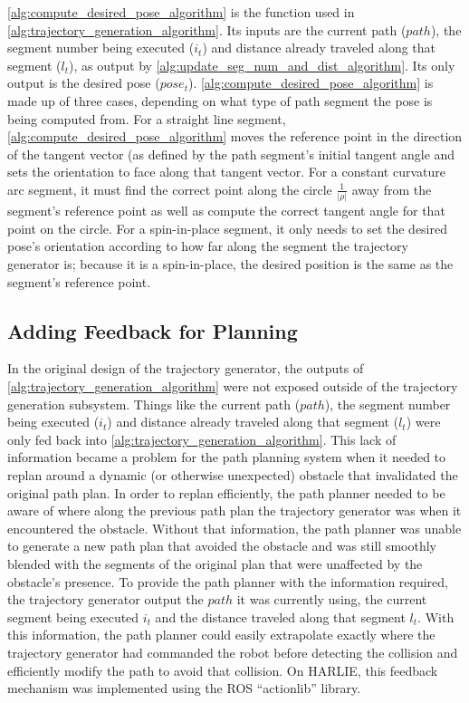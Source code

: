 \autoref{alg:compute_desired_pose_algorithm} is the \ComputeDesiredPose function used in \autoref{alg:trajectory_generation_algorithm}. Its inputs are the current path ($path$), the segment number being executed ($i_t$) and distance already traveled along that segment ($l_t$), as output by \autoref{alg:update_seg_num_and_dist_algorithm}. Its only output is the desired pose ($pose_t$). \autoref{alg:compute_desired_pose_algorithm} is made up of three cases, depending on what type of path segment the pose is being computed from. For a straight line segment, \autoref{alg:compute_desired_pose_algorithm} moves the reference point in the direction of the tangent vector (as defined by the path segment's initial tangent angle and sets the orientation to face along that tangent vector. For a constant curvature arc segment, it must find the correct point along the circle $\frac{1}{ | \rho | }$ away from the segment's reference point as well as compute the correct tangent angle for that point on the circle. For a spin-in-place segment, it only needs to set the desired pose's orientation according to how far along the segment the trajectory generator is; because it is a spin-in-place, the desired position is the same as the segment's reference point.

\subsection{Adding Feedback for Planning}\label{subsec:trajectory_generation_actionlib}

In the original design of the trajectory generator, the outputs of \autoref{alg:trajectory_generation_algorithm} were not exposed outside of the trajectory generation subsystem. Things like the current path ($path$), the segment number being executed ($i_t$) and distance already traveled along that segment ($l_t$) were only fed back into \autoref{alg:trajectory_generation_algorithm}. This lack of information became a problem for the path planning system when it needed to replan around a dynamic (or otherwise unexpected) obstacle that invalidated the original path plan. In order to replan efficiently, the path planner needed to be aware of where along the previous path plan the trajectory generator was when it encountered the obstacle. Without that information, the path planner was unable to generate a new path plan that avoided the obstacle and was still smoothly blended with the segments of the original plan that were unaffected by the obstacle's presence. To provide the path planner with the information required, the trajectory generator output the $path$ it was currently using, the current segment being executed $i_t$ and the distance traveled along that segment $l_t$. With this information, the path planner could easily extrapolate exactly where the trajectory generator had commanded the robot before detecting the collision and efficiently modify the path to avoid that collision. On HARLIE, this feedback mechanism was implemented using the ROS ``actionlib''  library.

